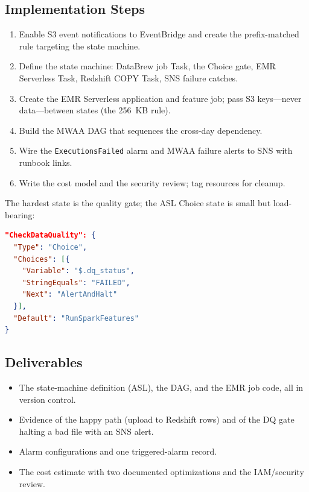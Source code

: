 \subsection*{Implementation Steps}
\begin{enumerate}
    \item Enable S3 event notifications to EventBridge and create the prefix-matched rule targeting the state machine.
    \item Define the state machine: DataBrew job Task, the Choice gate, EMR Serverless Task, Redshift COPY Task, SNS failure catches.
    \item Create the EMR Serverless application and feature job; pass S3 keys---never data---between states (the 256~KB rule).
    \item Build the MWAA DAG that sequences the cross-day dependency.
    \item Wire the \texttt{ExecutionsFailed} alarm and MWAA failure alerts to SNS with runbook links.
    \item Write the cost model and the security review; tag resources for cleanup.
\end{enumerate}

The hardest state is the quality gate; the ASL Choice state is small but load-bearing:

\begin{lstlisting}[language=json,caption={The data-quality gate as a Choice state.},label={lst:ch12-choice}]
"CheckDataQuality": {
  "Type": "Choice",
  "Choices": [{
    "Variable": "$.dq_status",
    "StringEquals": "FAILED",
    "Next": "AlertAndHalt"
  }],
  "Default": "RunSparkFeatures"
}
\end{lstlisting}

\subsection*{Deliverables}
\begin{itemize}
    \item The state-machine definition (ASL), the DAG, and the EMR job code, all in version control.
    \item Evidence of the happy path (upload to Redshift rows) and of the DQ gate halting a bad file with an SNS alert.
    \item Alarm configurations and one triggered-alarm record.
    \item The cost estimate with two documented optimizations and the IAM/security review.
\end{itemize}

